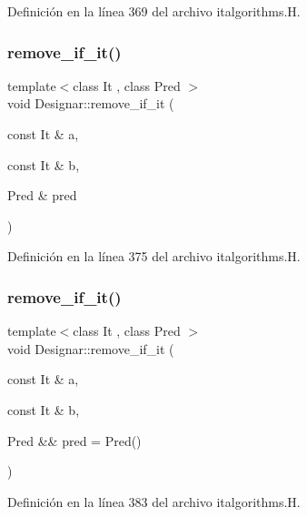 Definición en la línea 369 del archivo italgorithms.\+H.

\mbox{\label{namespace_designar_a4d9b53ca57cf3e6a1baf14e495c974a7}} 
\subsubsection{\texorpdfstring{remove\+\_\+if\+\_\+it()}{remove\_if\_it()}\hspace{0.1cm}{\footnotesize\ttfamily [1/2]}}
{\footnotesize\ttfamily template$<$class It , class Pred $>$ \\
void Designar\+::remove\+\_\+if\+\_\+it (\begin{DoxyParamCaption}\item[{const It \&}]{a,  }\item[{const It \&}]{b,  }\item[{Pred \&}]{pred }\end{DoxyParamCaption})}



Definición en la línea 375 del archivo italgorithms.\+H.

\mbox{\label{namespace_designar_afe463efc1ccacf9b22f6e5ea0619b2ac}} 
\subsubsection{\texorpdfstring{remove\+\_\+if\+\_\+it()}{remove\_if\_it()}\hspace{0.1cm}{\footnotesize\ttfamily [2/2]}}
{\footnotesize\ttfamily template$<$class It , class Pred $>$ \\
void Designar\+::remove\+\_\+if\+\_\+it (\begin{DoxyParamCaption}\item[{const It \&}]{a,  }\item[{const It \&}]{b,  }\item[{Pred \&\&}]{pred = {\ttfamily Pred()} }\end{DoxyParamCaption})}



Definición en la línea 383 del archivo italgorithms.\+H.

